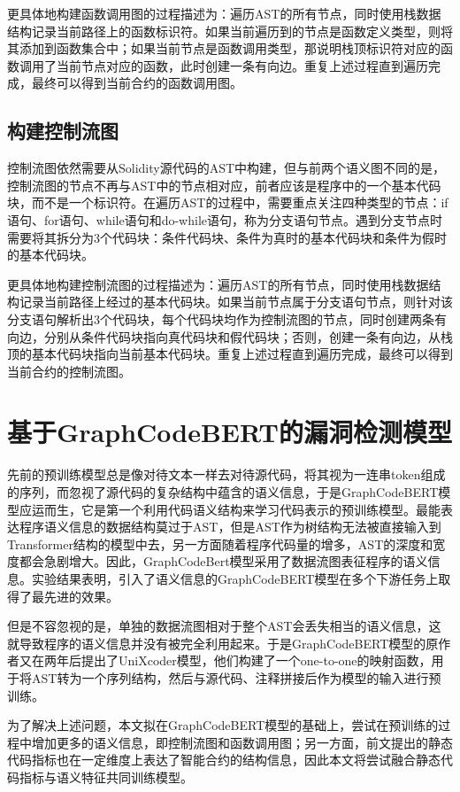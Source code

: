 更具体地构建函数调用图的过程描述为：遍历AST的所有节点，同时使用栈数据结构记录当前路径上的函数标识符。如果当前遍历到的节点是函数定义类型，则将其添加到函数集合中；如果当前节点是函数调用类型，那说明栈顶标识符对应的函数调用了当前节点对应的函数，此时创建一条有向边。重复上述过程直到遍历完成，最终可以得到当前合约的函数调用图。
\subsection{构建控制流图}
控制流图依然需要从Solidity源代码的AST中构建，但与前两个语义图不同的是，控制流图的节点不再与AST中的节点相对应，前者应该是程序中的一个基本代码块，而不是一个标识符。在遍历AST的过程中，需要重点关注四种类型的节点：if语句、for语句、while语句和do-while语句，称为分支语句节点。遇到分支节点时需要将其拆分为3个代码块：条件代码块、条件为真时的基本代码块和条件为假时的基本代码块。

更具体地构建控制流图的过程描述为：遍历AST的所有节点，同时使用栈数据结构记录当前路径上经过的基本代码块。如果当前节点属于分支语句节点，则针对该分支语句解析出3个代码块，每个代码块均作为控制流图的节点，同时创建两条有向边，分别从条件代码块指向真代码块和假代码块；否则，创建一条有向边，从栈顶的基本代码块指向当前基本代码块。重复上述过程直到遍历完成，最终可以得到当前合约的控制流图。

\section{基于GraphCodeBERT的漏洞检测模型}
先前的预训练模型总是像对待文本一样去对待源代码，将其视为一连串token组成的序列，而忽视了源代码的复杂结构中蕴含的语义信息，于是GraphCodeBERT模型应运而生，它是第一个利用代码语义结构来学习代码表示的预训练模型\cite{guo2020graphcodebert}。最能表达程序语义信息的数据结构莫过于AST，但是AST作为树结构无法被直接输入到Transformer结构的模型中去，另一方面随着程序代码量的增多，AST的深度和宽度都会急剧增大。因此，GraphCodeBert模型采用了数据流图表征程序的语义信息。实验结果表明，引入了语义信息的GraphCodeBERT模型在多个下游任务上取得了最先进的效果。

但是不容忽视的是，单独的数据流图相对于整个AST会丢失相当的语义信息，这就导致程序的语义信息并没有被完全利用起来。于是GraphCodeBERT模型的原作者又在两年后提出了UniXcoder模型\cite{unixcoder}，他们构建了一个one-to-one的映射函数，用于将AST转为一个序列结构，然后与源代码、注释拼接后作为模型的输入进行预训练。

为了解决上述问题，本文拟在GraphCodeBERT模型的基础上，尝试在预训练的过程中增加更多的语义信息，即控制流图和函数调用图；另一方面，前文提出的静态代码指标也在一定维度上表达了智能合约的结构信息，因此本文将尝试融合静态代码指标与语义特征共同训练模型。

